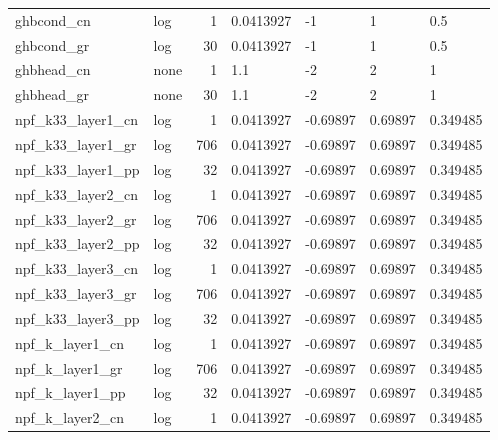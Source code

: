 \documentclass{article}
\begin{document}
\begin{center}
\begin{landscape}
\begin{longtable}{llrllll}
\bottomrule
\endlastfoot
         ghbcond\_cn &       log &      1 &      0.0413927 &             -1 &              1 &                0.5 \\
         ghbcond\_gr &       log &     30 &      0.0413927 &             -1 &              1 &                0.5 \\
         ghbhead\_cn &      none &      1 &            1.1 &             -2 &              2 &                  1 \\
         ghbhead\_gr &      none &     30 &            1.1 &             -2 &              2 &                  1 \\
  npf\_k33\_layer1\_cn &       log &      1 &      0.0413927 &       -0.69897 &        0.69897 &           0.349485 \\
  npf\_k33\_layer1\_gr &       log &    706 &      0.0413927 &       -0.69897 &        0.69897 &           0.349485 \\
  npf\_k33\_layer1\_pp &       log &     32 &      0.0413927 &       -0.69897 &        0.69897 &           0.349485 \\
  npf\_k33\_layer2\_cn &       log &      1 &      0.0413927 &       -0.69897 &        0.69897 &           0.349485 \\
  npf\_k33\_layer2\_gr &       log &    706 &      0.0413927 &       -0.69897 &        0.69897 &           0.349485 \\
  npf\_k33\_layer2\_pp &       log &     32 &      0.0413927 &       -0.69897 &        0.69897 &           0.349485 \\
  npf\_k33\_layer3\_cn &       log &      1 &      0.0413927 &       -0.69897 &        0.69897 &           0.349485 \\
  npf\_k33\_layer3\_gr &       log &    706 &      0.0413927 &       -0.69897 &        0.69897 &           0.349485 \\
  npf\_k33\_layer3\_pp &       log &     32 &      0.0413927 &       -0.69897 &        0.69897 &           0.349485 \\
    npf\_k\_layer1\_cn &       log &      1 &      0.0413927 &       -0.69897 &        0.69897 &           0.349485 \\
    npf\_k\_layer1\_gr &       log &    706 &      0.0413927 &       -0.69897 &        0.69897 &           0.349485 \\
    npf\_k\_layer1\_pp &       log &     32 &      0.0413927 &       -0.69897 &        0.69897 &           0.349485 \\
    npf\_k\_layer2\_cn &       log &      1 &      0.0413927 &       -0.69897 &        0.69897 &           0.349485 \\

\end{longtable}
\end{landscape}
\end{center}
\end{document}
